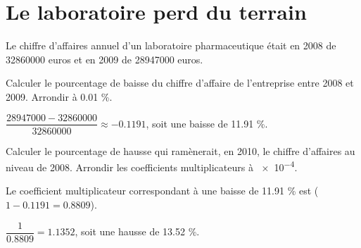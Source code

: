 \documentclass[a4paper,11pt]{exam}
\begin{document}
\section{Le laboratoire perd du terrain}

Le chiffre d'affaires annuel d'un laboratoire pharmaceutique était en 2008 de \num{32860000} euros et en 2009 de \num{28947000} euros.
\begin{questions}
	\question Calculer le pourcentage de baisse du chiffre d'affaire de l'entreprise entre 2008 et 2009. Arrondir à \num{0.01} \%.
	\begin{solution}
		$\dfrac{\num{28947000} - \num{32860000}}{\num{32860000}} \approx \num{-0.1191}$, soit une baisse de \num{11.91} \%.
	\end{solution}
	
	\question Calculer le pourcentage de hausse qui ramènerait, en 2010, le chiffre d'affaires au niveau de 2008. Arrondir les coefficients multiplicateurs à \num{e-4}.
	\begin{solution}
		Le coefficient multiplicateur correspondant à une baisse de \num{11.91} \% est ($1-\num{0.1191} = \num{0.8809}$).
		
		$\dfrac{1}{\num{0.8809}} = \num{1.1352}$, soit une hausse de \num{13.52} \%.
	\end{solution}
\end{questions}


%
%
%	

	\label{LastPage}
	
\end{document}
